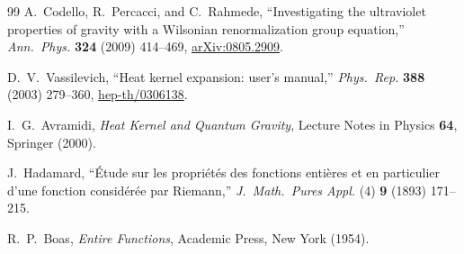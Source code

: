 \documentclass[11pt,a4paper]{article}
\theoremstyle{plain}
\theoremstyle{definition}
\begin{document}
\begin{thebibliography}{99}
A.~Codello, R.~Percacci, and C.~Rahmede,
``Investigating the ultraviolet properties of gravity with a
Wilsonian renormalization group equation,''
\emph{Ann.\ Phys.} \textbf{324} (2009) 414--469,
\href{https://arxiv.org/abs/0805.2909}{arXiv:0805.2909}.

D.~V.~Vassilevich,
``Heat kernel expansion: user's manual,''
\emph{Phys.\ Rep.} \textbf{388} (2003) 279--360,
\href{https://arxiv.org/abs/hep-th/0306138}{hep-th/0306138}.

I.~G.~Avramidi,
\emph{Heat Kernel and Quantum Gravity},
Lecture Notes in Physics \textbf{64}, Springer (2000).

J.~Hadamard,
``\'{E}tude sur les propri\'{e}t\'{e}s des fonctions enti\`{e}res
et en particulier d'une fonction consid\'{e}r\'{e}e par Riemann,''
\emph{J.\ Math.\ Pures Appl.} (4) \textbf{9} (1893) 171--215.

R.~P.~Boas,
\emph{Entire Functions},
Academic Press, New York (1954).

\end{thebibliography}
\end{document}
